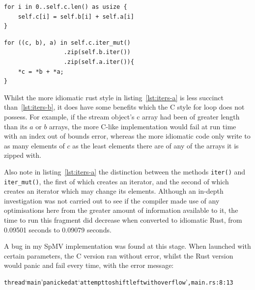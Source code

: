 \noindent\begin{minipage}{.45\textwidth}
    \begin{code}
\begin{verbatim}
for i in 0..self.c.len() as usize {
    self.c[i] = self.b[i] + self.a[i]
}
\end{verbatim}
    \label{lst:iters-b}
\end{code}
\end{minipage}\hfill
\begin{minipage}{.45\textwidth}
    \begin{code}
\begin{verbatim}
for ((c, b), a) in self.c.iter_mut()
                 .zip(self.b.iter())
                 .zip(self.a.iter()){
    *c = *b + *a;
}
\end{verbatim}
\label{lst:iters-a}
\end{code}
\end{minipage}

Whilst the more idiomatic rust style in listing~\ref{lst:iters-a} is less succinct than~\ref{lst:iters-b}, it does have some benefits which the C style for loop does not possess. For example, if the stream object's c array had been of greater length than its $a$ or $b$ arrays, the more C-like implementation would fail at run time with an index out of bounds error, whereas the more idiomatic code only write to as many elements of $c$ as the least elements there are of any of the arrays it is zipped with.

Also note in listing~\ref{lst:iters-a} the distinction between the methods \texttt{iter()} and \texttt{iter\_mut()}, the first of which creates an iterator, and the second of which creates an iterator which may change its elements. Although an in-depth investigation was not carried out to see if the compiler made use of any optimisations here from the greater amount of information available to it, the time to run this fragment did decrease when converted to idiomatic Rust, from 0.09501 seconds to 0.09079 seconds.

A bug in my SpMV implementation was found at this stage. When launched with certain parameters, the C version ran without error, whilst the Rust version would panic and fail every time, with the error message:

\begin{alltt}
\scriptsize
thread `main' panicked at `attempt to shift left with overflow', main.rs:8:13
\end{alltt}


